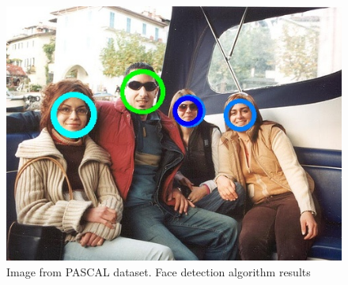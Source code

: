 
\begin{figure}[htb!]
\vspace{0pt}
\centering
\includegraphics[width=0.9\linewidth]{./figures/facedetected.jpg}
\vspace{0pt}
\caption{Image from PASCAL dataset. Face detection algorithm results}\label{fig:opencv_face_detection}
\vspace{0pt}
\end{figure}

